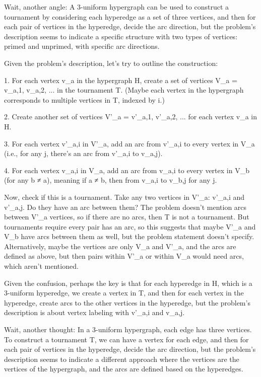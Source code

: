 Wait, another angle: A 3-uniform hypergraph can be used to construct a tournament by considering each hyperedge as a set of three vertices, and then for each pair of vertices in the hyperedge, decide the arc direction, but the problem's description seems to indicate a specific structure with two types of vertices: primed and unprimed, with specific arc directions.

Given the problem's description, let's try to outline the construction:

1. For each vertex v_a in the hypergraph H, create a set of vertices V_a = {v_a,1, v_a,2, ...} in the tournament T. (Maybe each vertex in the hypergraph corresponds to multiple vertices in T, indexed by i.)

2. Create another set of vertices V'_a = {v'_a,1, v'_a,2, ...} for each vertex v_a in H.

3. For each vertex v'_a,i in V'_a, add an arc from v'_a,i to every vertex in V_a (i.e., for any j, there's an arc from v'_a,i to v_a,j).

4. For each vertex v_a,i in V_a, add an arc from v_a,i to every vertex in V_b (for any b ≠ a), meaning if a ≠ b, then from v_a,i to v_b,j for any j.

Now, check if this is a tournament. Take any two vertices in V'_a: v'_a,i and v'_a,j. Do they have an arc between them? The problem doesn't mention arcs between V'_a vertices, so if there are no arcs, then T is not a tournament. But tournaments require every pair has an arc, so this suggests that maybe V'_a and V_b have arcs between them as well, but the problem statement doesn't specify. Alternatively, maybe the vertices are only V_a and V'_a, and the arcs are defined as above, but then pairs within V'_a or within V_a would need arcs, which aren't mentioned.

Given the confusion, perhaps the key is that for each hyperedge in H, which is a 3-uniform hyperedge, we create a vertex in T, and then for each vertex in the hyperedge, create arcs to the other vertices in the hyperedge, but the problem's description is about vertex labeling with v'_a,i and v_a,j.

Wait, another thought: In a 3-uniform hypergraph, each edge has three vertices. To construct a tournament T, we can have a vertex for each edge, and then for each pair of vertices in the hyperedge, decide the arc direction, but the problem's description seems to indicate a different approach where the vertices are the vertices of the hypergraph, and the arcs are defined based on the hyperedges.

